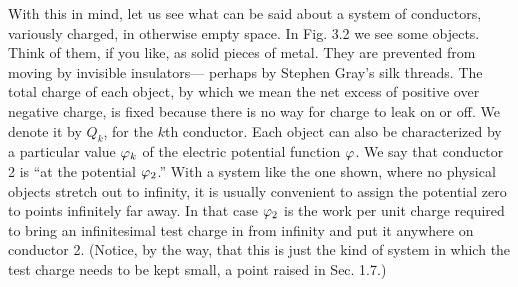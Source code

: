 
With this in mind, let us see what can be said about a system of
conductors, variously charged, in otherwise empty space. In Fig. 3.2
we see some objects. Think of them, if you like, as solid pieces of
metal. They are prevented from moving by invisible insulators---
perhaps by Stephen Gray's silk threads. The total charge of each
object, by which we mean the net excess of positive over negative
charge, is fixed because there is no way for charge to leak on or off.
We denote it by $Q_k$, for the $k$th conductor. Each object can also be
characterized by a particular value $\varphi_k$ of the electric potential function
$\varphi$. We say that conductor 2 is ``at the potential $\varphi_2$.'' With a
system like the one shown, where no physical objects stretch out to
infinity, it is usually convenient to assign the potential zero to points
infinitely far away. In that case $\varphi_2$ is the work per unit charge required
to bring an infinitesimal test charge in from infinity and put
it anywhere on conductor 2. (Notice, by the way, that this is just
the kind of system in which the test charge needs to be kept small, a
point raised in Sec. 1.7.)

